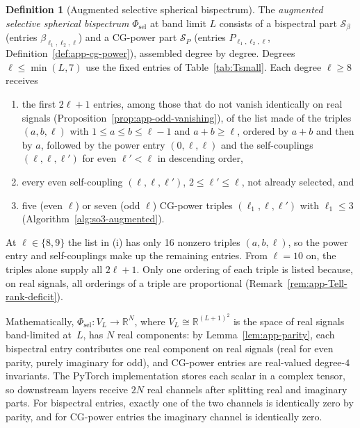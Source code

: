 \documentclass{article}
\theoremstyle{definition}
\newtheorem{definition}[theorem]{Definition}
\theoremstyle{remark}
\newcommand{\R}{\mathbb{R}}
\theoremstyle{definition}
\begin{document}
\begin{definition}[Augmented selective spherical bispectrum]\label{def:app-selective}
The \emph{augmented selective spherical bispectrum} $\Phi_{\mathrm{sel}}$ at
band limit $L$ consists of a bispectral part $\mathcal{S}_\beta$
(entries $\beta_{\ell_1,\ell_2,\ell}$) and a CG-power part
$\mathcal{S}_P$ (entries $P_{\ell_1,\ell_2,\ell}$,
Definition~\ref{def:app-cg-power}), assembled degree by degree.
Degrees $\ell\le\min(L,7)$ use the fixed entries of
Table~\ref{tab:Tsmall}. Each degree $\ell\ge 8$ receives
\begin{enumerate}[nosep,label=(\roman*)]
\item the first $2\ell{+}1$ entries, among those that do not vanish
  identically on real signals
  (Proposition~\ref{prop:app-odd-vanishing}), of the list made of the
  triples $(a,b,\ell)$ with $1\le a\le b\le\ell{-}1$ and
  $a{+}b\ge\ell$, ordered by $a{+}b$ and then by $a$, followed by the power entry
  $(0,\ell,\ell)$ and the self-couplings $(\ell,\ell,\ell')$ for even
  $\ell'<\ell$ in descending order,
\item every even self-coupling $(\ell,\ell,\ell')$,
  $2\le\ell'\le\ell$, not already selected, and
\item five (even $\ell$) or seven (odd $\ell$) CG-power triples
  $(\ell_1,\ell,\ell')$ with $\ell_1\le 3$
  (Algorithm~\ref{alg:so3-augmented}).
\end{enumerate}
At $\ell\in\{8,9\}$ the list in (i) has only 16 nonzero triples
$(a,b,\ell)$, so the power entry and self-couplings make up the remaining entries. From $\ell=10$ on, the triples alone supply
all $2\ell{+}1$. Only one ordering
of each triple is listed because, on real signals, all orderings of a
triple are proportional
(Remark~\ref{rem:app-Tell-rank-deficit}).

Mathematically, $\Phi_{\mathrm{sel}}:V_L\to\R^N$, where
$V_L\cong\R^{(L+1)^2}$ is the space of real signals band-limited
at~$L$, has $N$ real components: by
Lemma~\ref{lem:app-parity}, each bispectral entry contributes one
real component on real signals (real for even parity,
purely imaginary for odd), and CG-power entries are real-valued
degree-$4$ invariants. The PyTorch implementation stores each
scalar in a complex tensor, so downstream layers receive $2N$ real
channels after splitting real and imaginary parts. For bispectral
entries, exactly one of the two channels is identically zero by
parity, and for CG-power entries the imaginary channel is
identically zero.
\end{definition}
\end{document}

